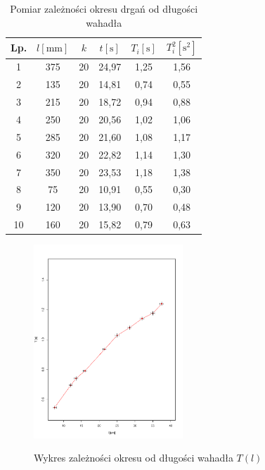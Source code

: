 \documentclass{fizraport}
\begin{document}
\begin{table}[!h]
\caption{Pomiar zależności okresu drgań od długości wahadła}
\label{T:varpos}
\begin{center}
\begin{tabular}{| c | c | c | c | c | c |}
\hline
\textbf{Lp.} & $l[\text{mm}]$
& $k$ & $t [\text{s}]$ & $T_i [\text{s}]$ & $T_i^2 [\text{s}^2]$  \\
\hline
1 & 375 & 20 & 24,97 & 1,25 & 1,56\\ \hline
2 & 135 & 20 & 14,81 & 0,74 & 0,55\\ \hline
3 & 215 & 20 & 18,72 & 0,94 & 0,88\\ \hline
4 & 250 & 20 & 20,56 & 1,02 & 1,06\\ \hline
5 & 285 & 20 & 21,60 & 1,08 & 1,17\\ \hline
6 & 320 & 20 & 22,82 & 1,14 & 1,30\\ \hline
7 & 350 & 20 & 23,53 & 1,18 & 1,38\\ \hline
8 & 75  & 20 & 10,91 & 0,55 & 0,30\\ \hline
9 & 120 & 20 & 13,90 & 0,70 & 0,48\\ \hline
10& 160 & 20 & 15,82 & 0,79 & 0,63\\ \hline

\end{tabular}
\end{center}
\end{table}
\begin{figure}
 \centering
  \caption{Wykres zależności okresu od długości wahadła $T(l)$}
 \includegraphics[width=0.5\textwidth,keepaspectratio=true]{WykresTodl.pdf}
 \label{fig:w2}
\end{figure}
\end{document}
